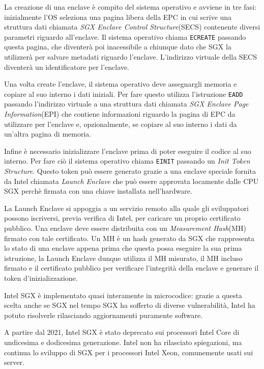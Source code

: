 \documentclass[12pt,italian]{report}
\begin{document}
La creazione di una enclave è compito del sistema operativo e
avviene in tre fasi:
inizialmente l'OS seleziona una pagina libera della EPC in cui scrive una
struttura dati chiamata \textit{SGX Enclave Control Structure}(SECS)
contenente diversi parametri riguardo all'enclave. 
Il sistema operativo chiama \texttt{ECREATE} passando questa pagina, che
diventerà poi inacessibile a chiunque dato che SGX la utilizzerà per
salvare metadati riguardo l'enclave.
L'indirizzo virtuale della SECS diventerà un identificatore per l'enclave.

Una volta create l'enclave, il sistema operativo deve assegnargli memoria
e copiare al suo interno i dati iniziali.
Per fare questo utilizza l'istruzione \texttt{EADD} passando
l'indirizzo virtuale a una struttura dati chiamata
\textit{SGX Enclave Page Information}(EPI) che contiene
informazioni riguardo la pagina di EPC da utilizzare per l'enclave
e, opzionalmente, se copiare al suo interno i dati da un'altra pagina
di memoria.

Infine è necessario inizializzare l'enclave prima di poter eseguire
il codice al suo interno.
Per fare ciò il sistema operativo chiama \texttt{EINIT} passando
un \textit{Init Token Structure}. Questo token può essere generato grazie
a una enclave speciale fornita da Intel chiamata \textit{Launch Enclave}
che può essere approvata locamente dalle CPU SGX perchè firmata con una
chiave installata nell'hardware.

La Launch Enclave si appoggia a un servizio remoto alla quale
gli sviluppatori possono iscriversi, previa verifica di Intel, per caricare
un proprio certificato pubblico.
Una enclave deve essere distribuita con un \textit{Measurement Hash}(MH)
firmato con tale certificato.
Un MH è un hash generato da SGX che rappresenta lo stato di una enclave appena
prima che questa possa eseguire la sua prima istruzione, la Launch Enclave
dunque utilizza il MH misurato, il MH incluso firmato e il
certificato pubblico per verificare l'integrità della enclave e generare il
token d'inizializzazione.

\medbreak \noindent

Intel SGX è implementato quasi interamente in microcodice: 
grazie a questa scelta anche se SGX nel tempo SGX ha sofferto
di diverse vulnerabilità, Intel ha potuto risolverle rilasciando
aggiornamenti puramente software.

A partire dal 2021, Intel SGX è stato deprecato sui processori Intel Core
di undicesima e dodicesima generazione\cite{sgx_deprecation}.
Intel non ha rilasciato spiegazioni, ma continua lo sviluppo di SGX per
i processori Intel Xeon, comunemente usati sui server. 
\end{document}
